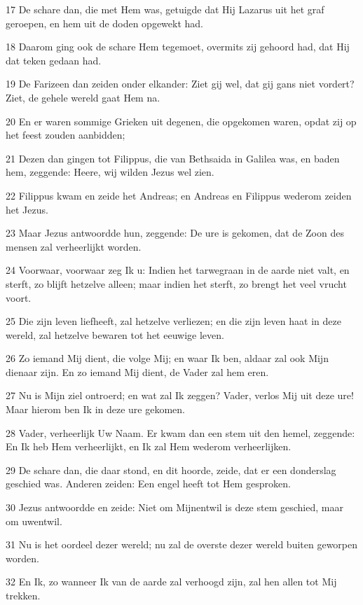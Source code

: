\par 17 De schare dan, die met Hem was, getuigde dat Hij Lazarus uit het graf geroepen, en hem uit de doden opgewekt had.
\par 18 Daarom ging ook de schare Hem tegemoet, overmits zij gehoord had, dat Hij dat teken gedaan had.
\par 19 De Farizeen dan zeiden onder elkander: Ziet gij wel, dat gij gans niet vordert? Ziet, de gehele wereld gaat Hem na.
\par 20 En er waren sommige Grieken uit degenen, die opgekomen waren, opdat zij op het feest zouden aanbidden;
\par 21 Dezen dan gingen tot Filippus, die van Bethsaida in Galilea was, en baden hem, zeggende: Heere, wij wilden Jezus wel zien.
\par 22 Filippus kwam en zeide het Andreas; en Andreas en Filippus wederom zeiden het Jezus.
\par 23 Maar Jezus antwoordde hun, zeggende: De ure is gekomen, dat de Zoon des mensen zal verheerlijkt worden.
\par 24 Voorwaar, voorwaar zeg Ik u: Indien het tarwegraan in de aarde niet valt, en sterft, zo blijft hetzelve alleen; maar indien het sterft, zo brengt het veel vrucht voort.
\par 25 Die zijn leven liefheeft, zal hetzelve verliezen; en die zijn leven haat in deze wereld, zal hetzelve bewaren tot het eeuwige leven.
\par 26 Zo iemand Mij dient, die volge Mij; en waar Ik ben, aldaar zal ook Mijn dienaar zijn. En zo iemand Mij dient, de Vader zal hem eren.
\par 27 Nu is Mijn ziel ontroerd; en wat zal Ik zeggen? Vader, verlos Mij uit deze ure! Maar hierom ben Ik in deze ure gekomen.
\par 28 Vader, verheerlijk Uw Naam. Er kwam dan een stem uit den hemel, zeggende: En Ik heb Hem verheerlijkt, en Ik zal Hem wederom verheerlijken.
\par 29 De schare dan, die daar stond, en dit hoorde, zeide, dat er een donderslag geschied was. Anderen zeiden: Een engel heeft tot Hem gesproken.
\par 30 Jezus antwoordde en zeide: Niet om Mijnentwil is deze stem geschied, maar om uwentwil.
\par 31 Nu is het oordeel dezer wereld; nu zal de overste dezer wereld buiten geworpen worden.
\par 32 En Ik, zo wanneer Ik van de aarde zal verhoogd zijn, zal hen allen tot Mij trekken.
